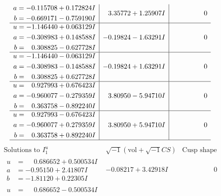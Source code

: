 \documentclass[1p]{elsarticle_modified}
\theoremstyle{definition}
\newcommand{\I}{\sqrt{-1}}
\begin{document}
$$\begin{array}{c|c|c}
\begin{aligned}
a &= -0.115708 + 0.172824 I \\
b &= -0.669171 - 0.759190 I\end{aligned}
 & \phantom{-}3.35772 + 1.25907 I & \phantom{-0.000000 } 0 \\ \hline\begin{aligned}
u &= -1.146440 + 0.063129 I \\
a &= -0.308983 + 0.148588 I \\
b &= \phantom{-}0.308825 - 0.627728 I\end{aligned}
 & -0.19824 - 1.63291 I & \phantom{-0.000000 } 0 \\ \hline\begin{aligned}
u &= -1.146440 - 0.063129 I \\
a &= -0.308983 - 0.148588 I \\
b &= \phantom{-}0.308825 + 0.627728 I\end{aligned}
 & -0.19824 + 1.63291 I & \phantom{-0.000000 } 0 \\ \hline\begin{aligned}
u &= \phantom{-}0.927993 + 0.676423 I \\
a &= -0.960077 - 0.279359 I \\
b &= \phantom{-}0.363758 - 0.892240 I\end{aligned}
 & \phantom{-}3.80950 - 5.94710 I & \phantom{-0.000000 } 0 \\ \hline\begin{aligned}
u &= \phantom{-}0.927993 - 0.676423 I \\
a &= -0.960077 + 0.279359 I \\
b &= \phantom{-}0.363758 + 0.892240 I\end{aligned}
 & \phantom{-}3.80950 + 5.94710 I & \phantom{-0.000000 } 0\\
 \hline 
 \end{array}$$\newpage$$\begin{array}{c|c|c}  
\text{Solutions to }I^u_{1}& \I (\text{vol} + \sqrt{-1}CS) & \text{Cusp shape}\\
 \hline 
\begin{aligned}
u &= \phantom{-}0.686652 + 0.500534 I \\
a &= -0.95150 + 2.41807 I \\
b &= -1.81120 + 0.22305 I\end{aligned}
 & -0.08217 + 3.42918 I & \phantom{-0.000000 } 0 \\ \hline\begin{aligned}
u &= \phantom{-}0.686652 - 0.500534 I \\

\end{aligned}
\end{array}$$
\end{document}
